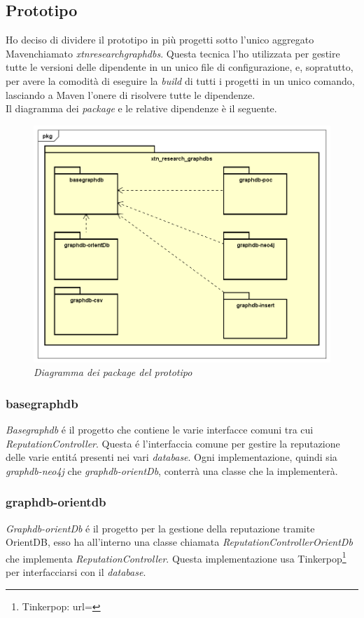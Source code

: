\subsection{Prototipo}
Ho deciso di dividere il prototipo in più progetti sotto l'unico aggregato Maven\glsfirstoccur chiamato \textit{xtn\textunderscore research\textunderscore graphdbs}. Questa tecnica l'ho utilizzata per gestire tutte le versioni delle dipendente in un unico file di configurazione, e, sopratutto, per avere la comodità di eseguire la \textit{build} di tutti i progetti in un unico comando, lasciando a Maven l'onere di risolvere tutte le dipendenze.\\
Il diagramma dei \textit{package} e le relative dipendenze è il seguente.
\begin{figure}[h!]
	\centering
	\includegraphics[scale=0.55]{immagini/packages.png}
	\caption{\textit{Diagramma dei package del prototipo}}
\end{figure}

\subsubsection{basegraphdb}
\textit{Basegraphdb} é il progetto che contiene le varie interfacce comuni tra cui \textit{ReputationController}. Questa é l'interfaccia comune per gestire la reputazione delle varie entitá presenti nei vari \textit{database}. Ogni implementazione, quindi sia \textit{graphdb-neo4j} che \textit{graphdb-orientDb}, conterrà una classe che la implementerà.
\subsubsection{graphdb-orientdb}
\textit{Graphdb-orientDb} é il progetto per la gestione della reputazione tramite OrientDB, esso ha all'interno una classe chiamata \textit{ReputationControllerOrientDb} che implementa \textit{ReputationController}. Questa implementazione usa Tinkerpop\footnote{Tinkerpop: url=} per interfacciarsi con il \textit{database}.
